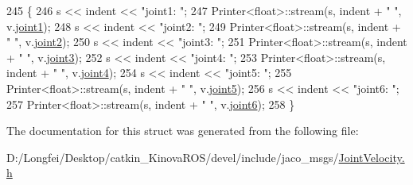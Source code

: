 \begin{DoxyCode}
245   \{
246     s << indent << \textcolor{stringliteral}{"joint1: "};
247     Printer<float>::stream(s, indent + \textcolor{stringliteral}{"  "}, v.\hyperlink{structjaco__msgs_1_1JointVelocity___ac67bdfc1a5c298799a523d8a9ba4b87e}{joint1});
248     s << indent << \textcolor{stringliteral}{"joint2: "};
249     Printer<float>::stream(s, indent + \textcolor{stringliteral}{"  "}, v.\hyperlink{structjaco__msgs_1_1JointVelocity___a4cb4b1f563bb3df4c9f2471f4682e33d}{joint2});
250     s << indent << \textcolor{stringliteral}{"joint3: "};
251     Printer<float>::stream(s, indent + \textcolor{stringliteral}{"  "}, v.\hyperlink{structjaco__msgs_1_1JointVelocity___aa14dad415721aae4794da85ea545843f}{joint3});
252     s << indent << \textcolor{stringliteral}{"joint4: "};
253     Printer<float>::stream(s, indent + \textcolor{stringliteral}{"  "}, v.\hyperlink{structjaco__msgs_1_1JointVelocity___a42d5c803c0510958d3ea50a5195fd430}{joint4});
254     s << indent << \textcolor{stringliteral}{"joint5: "};
255     Printer<float>::stream(s, indent + \textcolor{stringliteral}{"  "}, v.\hyperlink{structjaco__msgs_1_1JointVelocity___af03f322785d0b58fbd4bd639ad48545c}{joint5});
256     s << indent << \textcolor{stringliteral}{"joint6: "};
257     Printer<float>::stream(s, indent + \textcolor{stringliteral}{"  "}, v.\hyperlink{structjaco__msgs_1_1JointVelocity___ac4597081b297a5080198455fc6f13090}{joint6});
258   \}
\end{DoxyCode}


The documentation for this struct was generated from the following file\+:\begin{DoxyCompactItemize}
\item 
D\+:/\+Longfei/\+Desktop/catkin\+\_\+\+Kinova\+R\+O\+S/devel/include/jaco\+\_\+msgs/\hyperlink{JointVelocity_8h}{Joint\+Velocity.\+h}\end{DoxyCompactItemize}
